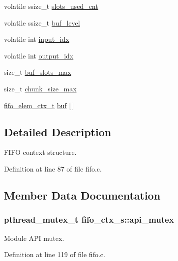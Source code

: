 \begin{DoxyCompactItemize}
\item 
volatile ssize\+\_\+t \hyperlink{structfifo__ctx__s_a566e90d020d2b7a45b6a8879c63106c2}{slots\+\_\+used\+\_\+cnt}
\item 
volatile ssize\+\_\+t \hyperlink{structfifo__ctx__s_a9661ff316afd08e4eb0919cd02e355ce}{buf\+\_\+level}
\item 
volatile int \hyperlink{structfifo__ctx__s_aa5c17b3a497d655710243cb2c14ef1bf}{input\+\_\+idx}
\item 
volatile int \hyperlink{structfifo__ctx__s_a28fca425f183a3add55c94dcdc5c04e0}{output\+\_\+idx}
\item 
size\+\_\+t \hyperlink{structfifo__ctx__s_a9e7f97c83e08c4dff68c1f4dedb25537}{buf\+\_\+slots\+\_\+max}
\item 
size\+\_\+t \hyperlink{structfifo__ctx__s_ab67621fb3c666a07ada8a20d03e3c26c}{chunk\+\_\+size\+\_\+max}
\item 
\hyperlink{fifo_8c_a3236a0200db719fdeb6d875a415ca7c9}{fifo\+\_\+elem\+\_\+ctx\+\_\+t} \hyperlink{structfifo__ctx__s_aaff82bce9d68fd7f61378270841b4969}{buf} \mbox{[}$\,$\mbox{]}
\end{DoxyCompactItemize}


\subsection{Detailed Description}
F\+I\+FO context structure. 

Definition at line 87 of file fifo.\+c.



\subsection{Member Data Documentation}
\subsubsection[{\texorpdfstring{api\+\_\+mutex}{api_mutex}}]{\setlength{\rightskip}{0pt plus 5cm}pthread\+\_\+mutex\+\_\+t fifo\+\_\+ctx\+\_\+s\+::api\+\_\+mutex}\hypertarget{structfifo__ctx__s_a27be272ae3fa045dfb5e64778a484725}{}\label{structfifo__ctx__s_a27be272ae3fa045dfb5e64778a484725}
Module A\+PI mutex. 

Definition at line 119 of file fifo.\+c.

